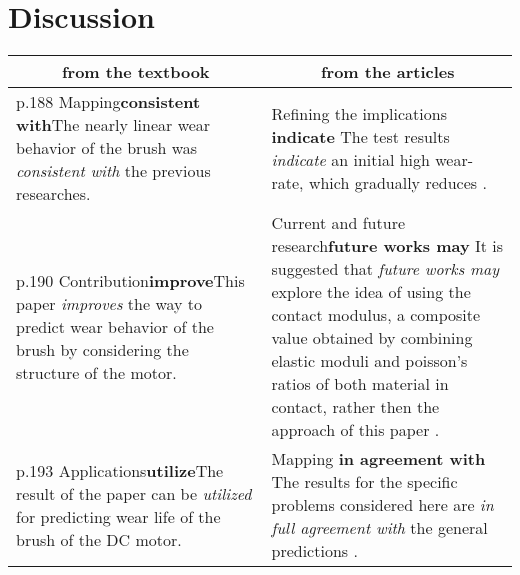 \documentclass[12pt]{article}
\begin{document}
\section{Discussion}

	\begin{longtable}{|p{}|p{}|}
		\hline
		\multicolumn{1}{|c|}{from the textbook}&\multicolumn{1}{c|}{from the articles}\\
		\hline
		\ding{175} p.188 Mapping\newline \textbf{consistent with}\newline The nearly linear wear behavior of the brush was \emph{consistent with} the previous researches.& \ding{174} Refining the implications \newline \textbf{indicate} \newline The test results \emph{indicate} an initial high wear-rate, which gradually reduces \cite{dis1}.\\
		\hline
		\ding{176} p.190 Contribution\newline \textbf{improve}\newline This paper \emph{improves} the way to predict wear behavior of the brush by considering the structure of the motor.& \ding{177} Current and future research\newline \textbf{future works may} \newline It is suggested that \emph{future works may} explore the idea of using
		the contact modulus, a composite value obtained by combining
		elastic moduli and poisson’s ratios of both material in contact,
		rather then the approach of this paper \cite{res3}.\\
		\hline
		\ding{178} p.193 Applications\newline \textbf{utilize}\newline The result of the paper can be \emph{utilized} for predicting wear life of the brush of the DC motor.& \ding{175} Mapping \newline \textbf{in agreement with} \newline The results for the specific problems considered here are \emph{in full agreement with} the general predictions \cite{dis3}.\\
		\hline
	\end{longtable}




\end{document}
